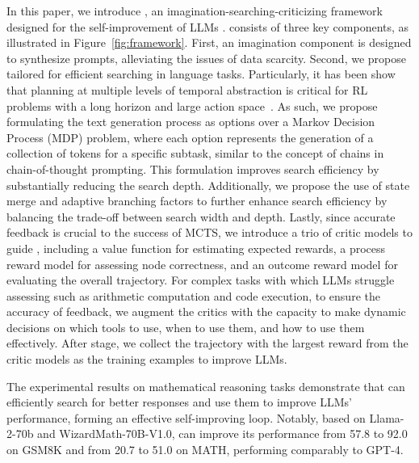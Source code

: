 In this paper, we introduce \model{}, an imagination-searching-criticizing framework designed for the self-improvement of LLMs . \model{} consists of three key components, as illustrated in Figure~\ref{fig:framework}. First, an imagination component is designed to synthesize prompts, alleviating the issues of data scarcity. Second, we propose \emcts{} tailored for efficient searching in language tasks. Particularly, it has been show that planning at multiple levels of temporal abstraction is critical for RL problems with a long horizon and large action space~\citep{sutton1999between,peng2017composite,Luketina2019ASO}. As such, we propose formulating the text generation process as options over a Markov Decision Process (MDP) problem, where each option represents the generation of a collection of tokens for a specific subtask, similar to the concept of chains in chain-of-thought prompting. This formulation improves search efficiency by substantially reducing the search depth. Additionally, we propose the use of state merge and adaptive branching factors to further enhance search efficiency by balancing the trade-off between search width and depth. Lastly, since accurate feedback is crucial to the success of MCTS, we introduce a trio of critic models to guide \emcts{}, including a value function for estimating expected rewards, a process reward model for assessing node correctness, and an outcome reward model for evaluating the overall trajectory. For complex tasks with which LLMs struggle assessing such as arithmetic computation and code execution, to ensure the accuracy of feedback, we augment the critics with the capacity to make dynamic decisions on which tools to use, when to use them, and how to use them effectively. After \emcts{} stage, we collect the trajectory with the largest reward from the critic models as the training examples to improve LLMs. 

The experimental results on mathematical reasoning tasks demonstrate that \model{} can efficiently search for better responses and use them to improve LLMs' performance, forming an effective self-improving loop. Notably, based on Llama-2-70b and WizardMath-70B-V1.0, \model{} can improve its performance from 57.8 to 92.0 on GSM8K and from 20.7 to 51.0 on MATH, performing comparably to GPT-4. 

